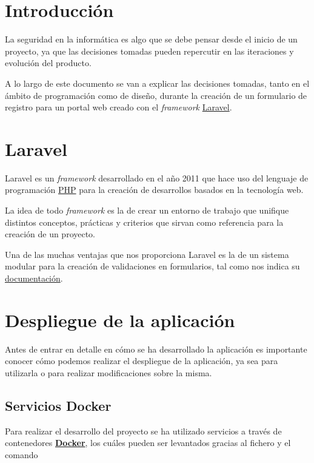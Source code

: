 \documentclass{\ClassPath/viu-tfm-template}
\begin{document}
\graphicspath{{../../VIU_TFM_LaTeX_template/}}

\coverpage

\tableofcontents

\chapter{Introducción}

La seguridad en la informática es algo que se debe pensar desde el inicio de un proyecto, ya que las decisiones tomadas pueden repercutir en las iteraciones y evolución del producto.

A lo largo de este documento se van a explicar las decisiones tomadas, tanto en el ámbito de programación como de diseño, durante la creación de un formulario de registro para un portal web creado con el \textit{framework} \href{https://laravel.com/}{Laravel}.


\chapter{Laravel}

Laravel es un \textit{framework} desarrollado en el año 2011 que hace uso del lenguaje de programación \href{https://www.php.net/}{PHP} para la creación de desarrollos basados en la tecnología web.

La idea de todo \textit{framework} es la de crear un entorno de trabajo que unifique distintos conceptos, prácticas y criterios que sirvan como referencia para la creación de un proyecto.

Una de las muchas ventajas que nos proporciona Laravel es la de un sistema modular para la creación de validaciones en formularios, tal como nos indica su \href{https://laravel.com/docs/6.x/validation}{documentación}.

\chapter{Despliegue de la aplicación}
Antes de entrar en detalle en cómo se ha desarrollado la aplicación es importante conocer cómo podemos realizar el despliegue de la aplicación, ya sea para utilizarla o para realizar modificaciones sobre la misma.

\section{Servicios Docker}
Para realizar el desarrollo del proyecto se ha utilizado servicios a través de contenedores \textbf{\href{https://www.docker.com/}{Docker}}, los cuáles pueden ser levantados gracias al fichero  y el comando 
\end{document}
